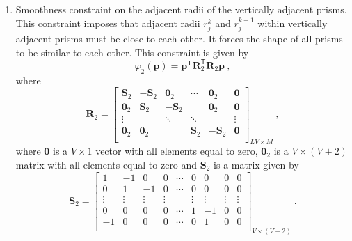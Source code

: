 \begin{enumerate}
\item Smoothness constraint on the adjacent radii of the vertically adjacent prisms. This constraint imposes that adjacent radii 
$r_{j}^{k}$ and $r_{j}^{k+1}$ within vertically adjacent prisms must be close to each other. It forces the shape of all prisms to be 
similar to each other. 
This constraint is given by
\begin{equation}
\varphi_{2}(\mathbf{p}) = \mathbf{p}^\mathsf{T}\mathbf{R}^\mathsf{T}_{2}\mathbf{R}_{2}\mathbf{p} \: ,
\label{eq:phi2}
\end{equation}
where 
\begin{equation}
\mathbf{R}_{2} = 
\begin{bmatrix}
\mathbf{S}_{2} & -\mathbf{S}_{2} &  \mathbf{0}_{2} & \cdots         &  \mathbf{0}_{2} & \mathbf{0} \\
\mathbf{0}_{2} &  \mathbf{S}_{2} & -\mathbf{S}_{2} &                &  \mathbf{0}_{2} & \mathbf{0} \\
\vdots         &                 & \ddots          & \ddots         &                 & \vdots     \\
\mathbf{0}_{2} &  \mathbf{0}_{2} &                 & \mathbf{S}_{2} & -\mathbf{S}_{2} & \mathbf{0} \\
\end{bmatrix}_{LV \times M} \: ,
\label{eq:R2-matrix}
\end{equation}
where $\mathbf{0}$ is a $V \times 1$ vector with all elements equal to zero, $\mathbf{0}_{2}$ is a 
$V \times (V+2)$ matrix with all elements equal to zero and $\mathbf{S}_{2}$ is a matrix given by 
\begin{equation}
\mathbf{S}_{2} = 
\begin{bmatrix}
 1      & -1     &  0     & 0      & \cdots &  0     &  0     & 0      & 0      \\
 0      &  1     & -1     & 0      & \cdots &  0     &  0     & 0      & 0      \\
\vdots  & \vdots & \vdots & \vdots &        & \vdots & \vdots & \vdots & \vdots \\
 0      &  0     &  0     & 0      & \cdots & 1      & -1     & 0      & 0      \\
-1      &  0     &  0     & 0      & \cdots & 0      &  1     & 0      & 0      \\
\end{bmatrix}_{V \times (V+2)} \: .
\label{eq:S2-matrix}
\end{equation}


\end{enumerate}
